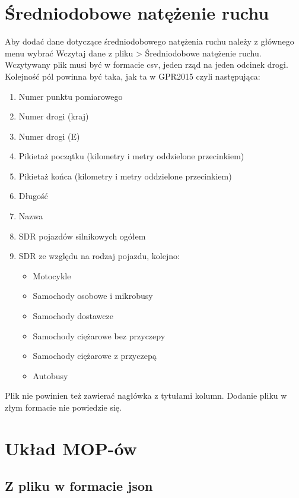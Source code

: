 \documentclass[10pt,paper=a4 BCOR0, DIV15, titlepage=false, oneside]{scrbook} %
\begin{document}
      \section{Średniodobowe natężenie ruchu}
        Aby dodać dane dotyczące średniodobowego natężenia ruchu należy z
        głównego menu wybrać Wczytaj dane z pliku > Średniodobowe natężenie
        ruchu. Wczytywany plik musi być w formacie csv, jeden rząd na jeden
        odcinek drogi. Kolejność pól powinna być taka, jak ta w GPR2015 czyli następująca:
        \begin{enumerate}
          \item Numer punktu pomiarowego
          \item Numer drogi (kraj)
          \item Numer drogi (E)
          \item Pikietaż początku (kilometry i metry oddzielone przecinkiem)
          \item Pikietaż końca (kilometry i metry oddzielone przecinkiem)
          \item Długość
          \item Nazwa
          \item SDR pojazdów silnikowych ogółem 
          \item SDR ze względu na rodzaj pojazdu, kolejno:
          \begin{itemize}
            \item Motocykle
            \item Samochody osobowe i mikrobusy
            \item Samochody dostawcze
            \item Samochody ciężarowe bez przyczepy
            \item Samochody ciężarowe z przyczepą
            \item Autobusy 
          \end{itemize}
        \end{enumerate}
        Plik nie powinien też zawierać nagłówka z tytułami kolumn. Dodanie
        pliku w złym formacie nie powiedzie się.

        \section{Układ MOP-ów}
        \subsection{Z pliku w formacie json}
\end{document}
